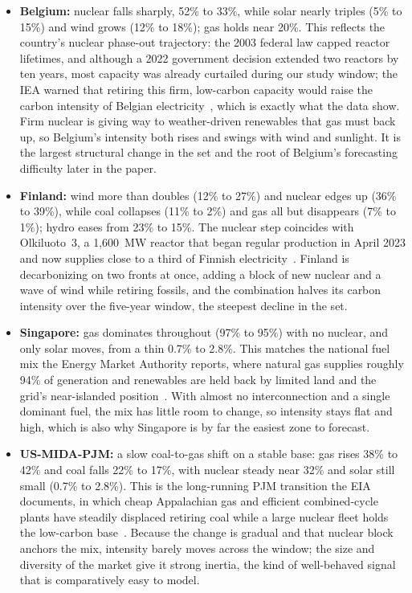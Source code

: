 \documentclass[sigconf,nonacm,a4paper]{acmart}  %
\begin{document}
\begin{itemize}[leftmargin=1em]
\item \textbf{Belgium:} nuclear falls sharply, 52\% to 33\%, while solar nearly
triples (5\% to 15\%) and wind grows (12\% to 18\%); gas holds near 20\%. This reflects the country's nuclear phase-out trajectory: the 2003 federal law capped
reactor lifetimes, and although a 2022 government decision extended two reactors by
ten years, most capacity was already curtailed during our study window; the IEA warned
that retiring this firm, low-carbon capacity would raise the carbon intensity of Belgian
electricity~\cite{iea2022belgium}, which is exactly what the data show. Firm nuclear is giving way to weather-driven renewables that gas must back up, so Belgium's intensity both rises and swings with wind and sunlight. It is the largest structural change in the set and the root of Belgium's forecasting difficulty later in the paper.

\item \textbf{Finland:} wind more than doubles (12\% to 27\%) and nuclear edges up
(36\% to 39\%), while coal collapses (11\% to 2\%) and gas all but disappears (7\%
to 1\%); hydro eases from 23\% to 15\%. The nuclear step coincides with Olkiluoto~3, a
1{,}600~MW reactor that began regular production in April 2023 and now supplies close
to a third of Finnish electricity~\cite{tvo2023ol3}. Finland is
decarbonizing on two fronts at once, adding a block of new nuclear and a wave of
wind while retiring fossils, and the combination halves its carbon intensity
over the five-year window, the steepest decline in the set.

\item \textbf{Singapore:} gas dominates throughout (97\% to 95\%) with no nuclear,
and only solar moves, from a thin 0.7\% to 2.8\%. This matches the national fuel mix
the Energy Market Authority reports, where natural gas supplies roughly 94\% of
generation and renewables are held back by limited land and the grid's near-islanded
position~\cite{emases}. With almost no interconnection and a single dominant fuel, the
mix has little room to change, so intensity stays flat and high, which is also why
Singapore is by far the easiest zone to forecast.

\item \textbf{US-MIDA-PJM:} a slow coal-to-gas shift on a stable base: gas rises
38\% to 42\% and coal falls 22\% to 17\%, with nuclear steady near 32\% and solar
still small (0.7\% to 2.8\%). This is the long-running PJM transition the EIA
documents, in which cheap Appalachian gas and efficient combined-cycle plants have
steadily displaced retiring coal while a large nuclear fleet holds the low-carbon
base~\cite{eia2018pjmgas}. Because the change is gradual and that nuclear block anchors
the mix, intensity barely moves across the window; the size and diversity of the
market give it strong inertia, the kind of well-behaved signal that is comparatively
easy to model.


\end{itemize}
\end{document}
